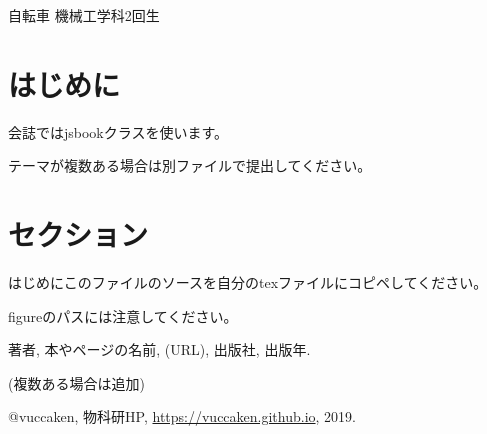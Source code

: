 \documentclass[10pt,b5paper,papersize,dvipdfmx]{jsbook}
\begin{document}


\kaishititle%
  {自転車}%
  {機械工学科2回生}%
  {}%

%
\section*{はじめに}
会誌ではjsbookクラスを使います。\par
テーマが複数ある場合は別ファイルで提出してください。

%
\section{セクション}
はじめにこのファイルのソースを自分のtexファイルにコピペしてください。\par
figureのパスには注意してください。









\begin{thebibliography}{99}
  \item 著者, 本やページの名前, (URL), 出版社, 出版年.
  \item (複数ある場合は追加)
  \item @vuccaken, 物科研HP, \url{https://vuccaken.github.io}, 2019.
\end{thebibliography}
\end{document}
